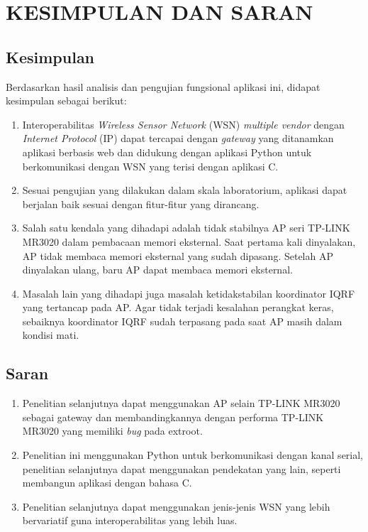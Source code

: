 
\chapter{KESIMPULAN DAN SARAN}

\section{Kesimpulan}
	Berdasarkan hasil analisis dan pengujian fungsional aplikasi ini, didapat kesimpulan sebagai berikut:

	\begin{enumerate}
		\item Interoperabilitas \emph{Wireless Sensor Network} (WSN) \emph{multiple vendor} dengan \emph{Internet Protocol} (IP) dapat tercapai dengan \emph{gateway} yang ditanamkan aplikasi berbasis web dan didukung dengan aplikasi Python untuk berkomunikasi dengan WSN yang terisi dengan aplikasi C.

		\item Sesuai pengujian yang dilakukan dalam skala laboratorium, aplikasi dapat berjalan baik sesuai dengan fitur-fitur yang dirancang.

		\item Salah satu kendala yang dihadapi adalah tidak stabilnya AP seri TP-LINK MR3020 dalam pembacaan memori eksternal. Saat pertama kali dinyalakan, AP tidak membaca memori eksternal yang sudah dipasang. Setelah AP dinyalakan ulang, baru AP dapat membaca memori eksternal.

		\item Masalah lain yang dihadapi juga masalah ketidakstabilan koordinator IQRF yang tertancap pada AP. Agar tidak terjadi kesalahan perangkat keras, sebaiknya koordinator IQRF sudah terpasang pada saat AP masih dalam kondisi mati.
	\end{enumerate}


\section{Saran}
	\begin{enumerate}
		\item Penelitian selanjutnya dapat menggunakan AP selain TP-LINK MR3020 sebagai gateway dan membandingkannya dengan performa TP-LINK MR3020 yang memiliki \emph{bug} pada extroot.
		\item Penelitian ini menggunakan Python untuk berkomunikasi dengan kanal serial, penelitian selanjutnya dapat menggunakan pendekatan yang lain, seperti membangun aplikasi dengan bahasa C.
		\item Penelitian selanjutnya dapat menggunakan jenis-jenis WSN yang lebih bervariatif guna interoperabilitas yang lebih luas.
	\end{enumerate}

	
\begin{comment}

\end{comment}
